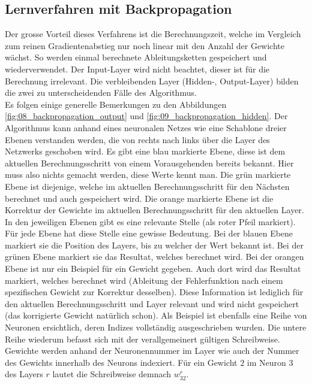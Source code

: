 \newpage
\subsection{Lernverfahren mit Backpropagation}
Der grosse Vorteil dieses Verfahrens ist die Berechnungszeit, welche im Vergleich zum reinen Gradientenabstieg nur noch
linear mit den Anzahl der Gewichte wächst. So werden einmal berechnete Ableitungsketten gespeichert und wiederverwendet.
Der Input-Layer wird nicht beachtet, dieser ist für die Berechnung irrelevant. Die verbleibenden Layer (Hidden-, Output-Layer)
bilden die zwei zu unterscheidenden Fälle des Algorithmus.
\\

Es folgen einige generelle Bemerkungen zu den Abbildungen \ref{fig:08_backpropagation_output} und \ref{fig:09_backpropagation_hidden}.
Der Algorithmus kann anhand eines neuronalen Netzes wie eine Schablone dreier Ebenen verstanden werden, die von rechts
nach links über die Layer des Netzwerks geschoben wird.
Es gibt eine blau markierte Ebene, diese ist dem aktuellen Berechnungsschritt von einem Vorausgehenden bereits bekannt.
Hier muss also nichts gemacht werden, diese Werte kennt man. Die grün markierte Ebene ist diejenige, welche im aktuellen
Berechnungsschritt für den Nächsten berechnet und auch gespeichert wird. Die orange markierte Ebene ist
die Korrektur der Gewichte im aktuellen Berechnungsschritt für den aktuellen Layer. In den jeweiligen Ebenen gibt
es eine relevante Stelle (als roter Pfeil markiert). Für jede Ebene hat diese Stelle eine gewisse Bedeutung. Bei der blauen Ebene markiert sie die
Position des Layers, bis zu welcher der Wert bekannt ist. Bei der grünen Ebene markiert sie das Resultat, welches berechnet
wird. Bei der orangen Ebene ist nur ein Beispiel für ein Gewicht gegeben. Auch dort wird das Resultat markiert, welches
berechnet wird (Ableitung der Fehlerfunktion nach einem spezifischen Gewicht zur Korrektur desselben). Diese Information
ist lediglich für den aktuellen Berechnungsschritt und Layer relevant und wird nicht gespeichert (das korrigierte Gewicht natürlich
schon). Als Beispiel ist ebenfalls eine Reihe von Neuronen ersichtlich, deren Indizes vollständig ausgeschrieben wurden.
Die untere Reihe wiederum befasst sich mit der verallgemeinert gültigen Schreibweise. Gewichte werden anhand der Neuronennummer
im Layer wie auch der Nummer des Gewichts innerhalb des Neurons indexiert. Für ein Gewicht $2$ im Neuron $3$ des Layers
$r$ lautet die Schreibweise demnach $w_{32}^r$.
\\

